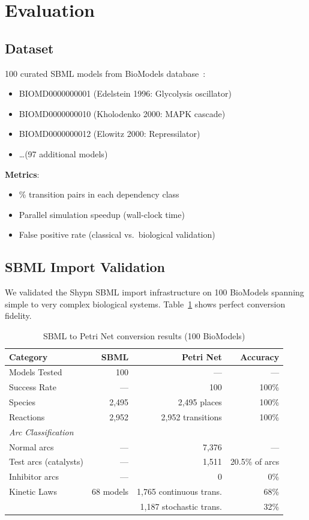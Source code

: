 \documentclass[runningheads]{llncs}
\begin{document}
\section{Evaluation}

\subsection{Dataset}

100 curated SBML models from BioModels database~\cite{Malik-Sheriff2020}:
\begin{itemize}
    \item BIOMD0000000001 (Edelstein 1996: Glycolysis oscillator)
    \item BIOMD0000000010 (Kholodenko 2000: MAPK cascade)
    \item BIOMD0000000012 (Elowitz 2000: Repressilator)
    \item \ldots (97 additional models)
\end{itemize}

\textbf{Metrics}:
\begin{itemize}
    \item \% transition pairs in each dependency class
    \item Parallel simulation speedup (wall-clock time)
    \item False positive rate (classical vs.\ biological validation)
\end{itemize}

\subsection{SBML Import Validation}

We validated the Shypn SBML import infrastructure on 100 BioModels spanning simple to very complex biological systems. Table~\ref{tab:sbml-import-real} shows perfect conversion fidelity.

\begin{table}[t]
\centering
\caption{SBML to Petri Net conversion results (100 BioModels)}
\label{tab:sbml-import-real}
\begin{tabular}{lrrr}
\toprule
\textbf{Category} & \textbf{SBML} & \textbf{Petri Net} & \textbf{Accuracy} \\
\midrule
Models Tested & 100 & --- & --- \\
Success Rate & --- & 100 & 100\% \\
\midrule
Species & 2,495 & 2,495 places & 100\% \\
Reactions & 2,952 & 2,952 transitions & 100\% \\
\midrule
\multicolumn{4}{l}{\textit{Arc Classification}} \\
Normal arcs & --- & 7,376 & --- \\
Test arcs (catalysts) & --- & 1,511 & 20.5\% of arcs \\
Inhibitor arcs & --- & 0 & 0\% \\
\midrule
Kinetic Laws & 68 models & 1,765 continuous trans. & 68\% \\
& & 1,187 stochastic trans. & 32\% \\
\bottomrule
\end{tabular}
\end{table}
\end{document}
